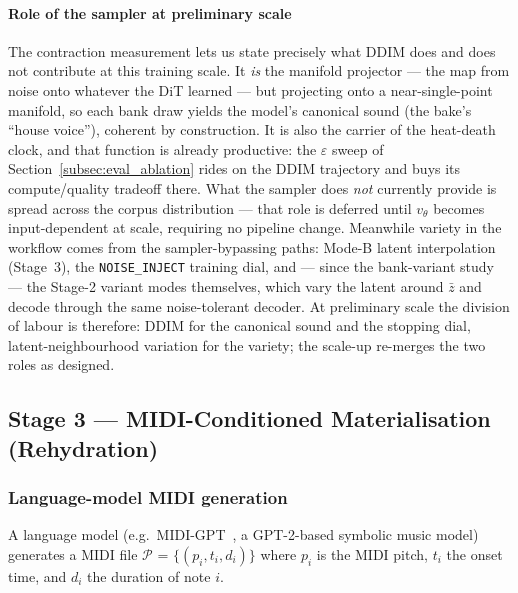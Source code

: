 \documentclass[12pt,a4paper]{article}
\begin{document}
\paragraph{Role of the sampler at preliminary scale}
The contraction measurement lets us state precisely what DDIM does and
does not contribute at this training scale. It \emph{is} the manifold
projector — the map from noise onto whatever the DiT learned — but
projecting onto a near-single-point manifold, so each bank draw yields
the model's canonical sound (the bake's ``house voice''), coherent by
construction. It is also the carrier of the heat-death clock, and that
function is already productive: the $\varepsilon$ sweep of
Section~\ref{subsec:eval_ablation} rides on the DDIM trajectory and
buys its compute/quality tradeoff there. What the sampler does
\emph{not} currently provide is spread across the corpus distribution —
that role is deferred until $v_\theta$ becomes input-dependent at
scale, requiring no pipeline change. Meanwhile variety in the workflow
comes from the sampler-bypassing paths: Mode-B latent interpolation
(Stage~3), the \texttt{NOISE\_INJECT} training dial, and — since the
bank-variant study — the Stage-2 variant modes themselves, which vary
the latent around $\bar{z}$ and decode through the same
noise-tolerant decoder. At preliminary
scale the division of labour is therefore: DDIM for the canonical sound
and the stopping dial, latent-neighbourhood variation for the variety;
the scale-up re-merges the two roles as designed.

\subsection{Stage 3 — MIDI-Conditioned Materialisation (Rehydration)}
\label{subsec:stage3}

\subsubsection{Language-model MIDI generation}

A language model (e.g.\ MIDI-GPT~\cite{midigpt2025}, a GPT-2-based
symbolic music model) generates a MIDI
file $\mathcal{P}$ = $\{(p_i, t_i, d_i)\}$ where $p_i$ is the MIDI pitch,
$t_i$ the onset time, and $d_i$ the duration of note $i$.
\end{document}
